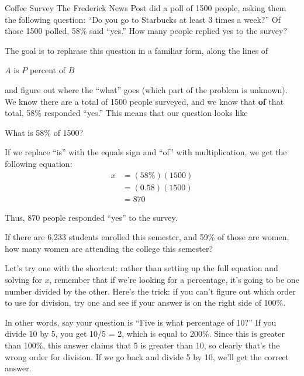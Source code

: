 \begin{example}[https://www.youtube.com/watch?v=cApv0GeF2XM]{Coffee Survey}
The Frederick News Post did a poll of 1500 people, asking them the following question: ``Do you go to Starbucks at least 3 times a week?'' Of those 1500 polled, 58\% said ``yes.''  How many people replied yes to the survey?

\sol
The goal is to rephrase this question in a familiar form, along the lines of 
\begin{center}
$A$ is $P$ percent of $B$
\end{center}
and figure out where the ``what'' goes (which part of the problem is unknown).\\

We know there are a total of 1500 people surveyed, and we know that \textbf{of} that total, 58\% responded ``yes.''  This means that our question looks like
\begin{center}
What is 58\% of 1500?
\end{center}

If we replace ``is'' with the equals sign and ``of'' with multiplication, we get the following equation:
\begin{align*}
x &= (58\%)(1500)\\
&= (0.58)(1500)\\
&= \boxed{870}
\end{align*}

Thus, 870 people responded ``yes'' to the survey.
\end{example}

\begin{try}
If there are 6,233 students enrolled this semester, and 59\% of those are women, how many women are attending the college this semester?
\end{try}

Let's try one with the shortcut: rather than setting up the full equation and solving for $x$, remember that if we're looking for a percentage, it's going to be one number divided by the other.  Here's the trick: if you can't figure out which order to use for division, try one and see if your answer is on the right side of 100\%.

In other words, say your question is ``Five is what percentage of 10?''  If you divide 10 by 5, you get 10/5 = 2, which is equal to 200\%.  Since this is greater than 100\%, this answer claims that 5 is greater than 10, so clearly that's the wrong order for division.  If we go back and divide 5 by 10, we'll get the correct answer.


